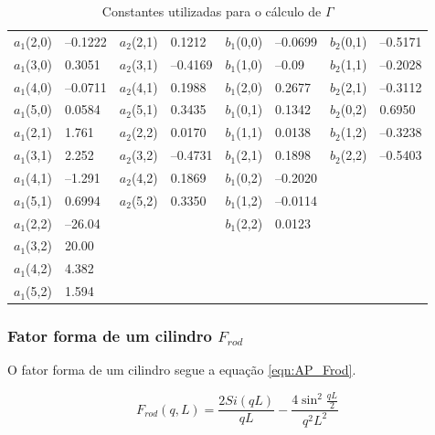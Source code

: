 \begin{apendicesenv}
\begin{table}[h]
    \IBGEtab%
    {\caption{Constantes utilizadas para o cálculo de $\Gamma$}
    \label{tab_ap:AiBi}}%
    {\begin{tabular}{r l | r l | r l | r l}
    	\toprule
    	$a_1$(2,0) & --0.1222 & $a_2$(2,1) & 0.1212   & $b_1$(0,0) & --0.0699 & $b_2$(0,1) & --0.5171 \\
    	$a_1$(3,0) & 0.3051   & $a_2$(3,1) & --0.4169 & $b_1$(1,0) & --0.09   & $b_2$(1,1) & --0.2028 \\
    	$a_1$(4,0) & --0.0711 & $a_2$(4,1) & 0.1988   & $b_1$(2,0) & 0.2677   & $b_2$(2,1) & --0.3112 \\
    	$a_1$(5,0) & 0.0584   & $a_2$(5,1) & 0.3435   & $b_1$(0,1) & 0.1342   & $b_2$(0,2) & 0.6950   \\
    	$a_1$(2,1) & 1.761    & $a_2$(2,2) & 0.0170   & $b_1$(1,1) & 0.0138   & $b_2$(1,2) & --0.3238 \\
    	$a_1$(3,1) & 2.252    & $a_2$(3,2) & --0.4731 & $b_1$(2,1) & 0.1898   & $b_2$(2,2) & --0.5403 \\
    	$a_1$(4,1) & --1.291  & $a_2$(4,2) & 0.1869   & $b_1$(0,2) & --0.2020 &            &          \\
    	$a_1$(5,1) & 0.6994   & $a_2$(5,2) & 0.3350   & $b_1$(1,2) & --0.0114 &            &          \\
    	$a_1$(2,2) & --26.04  &            &          & $b_1$(2,2) & 0.0123   &            &          \\
    	$a_1$(3,2) & 20.00    &            &          &            &          &            &          \\
    	$a_1$(4,2) & 4.382    &            &          &            &          &            &          \\
    	$a_1$(5,2) & 1.594    &            &          &            &          &            &          \\ \bottomrule
    \end{tabular} }%
    {}%
\end{table}

\subsubsection{Fator forma de um cilindro $F_{rod}$}

O fator forma de um cilindro segue a equação \ref{eqn:AP_Frod}.

\begin{equation}
F_{rod}(q, L) = \frac{2Si(qL)}{qL} - \frac{4\sin^2\frac{qL}{2}}{q^2L^2}
\label{eqn:AP_Frod}
\end{equation}


\end{apendicesenv}
